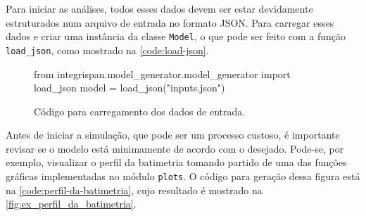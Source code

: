 
Para iniciar as análises, todos esses dados devem ser estar devidamente estruturados num arquivo de entrada no formato JSON.
Para carregar esses dados e criar uma instância da classe \texttt{Model}, o que pode ser feito com a função \texttt{load\_json}, como mostrado na \autoref{code:load-json}.


\begin{figure}
	\caption{Código para carregamento dos dados de entrada.}\label{code:load-json}
	\begin{pythoncode}
from integrispan.model_generator.model_generator import load_json
model = load_json("inputs.json")
	\end{pythoncode}
\end{figure}

Antes de iniciar a simulação, que pode ser um processo custoso, é importante revisar se o modelo está minimamente de acordo com o desejado. Pode-se, por exemplo, visualizar o perfil da batimetria tomando partido de uma das funções gráficas implementadas no módulo \texttt{plots}. O código para geração dessa figura está na \autoref{code:perfil-da-batimetria}, cujo resultado é mostrado na \autoref{fig:ex_perfil_da_batimetria}.

